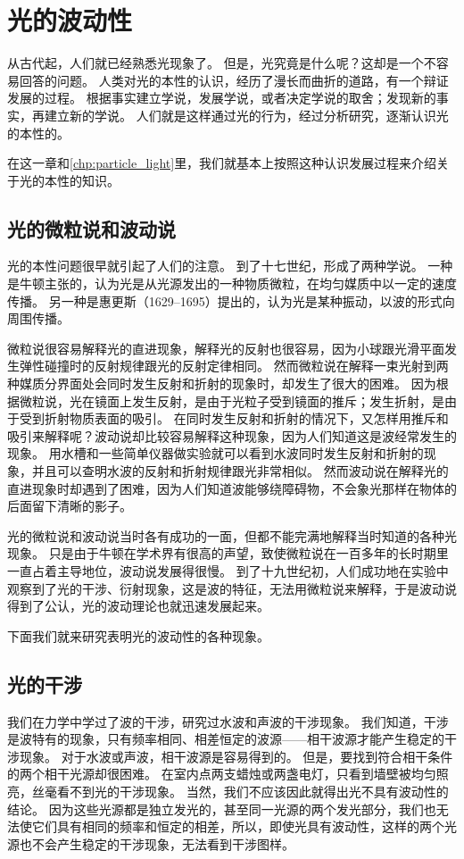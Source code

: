 
\chapter{光的波动性}\label{chp:light_wave_properties}
从古代起，人们就已经熟悉光现象了。
但是，光究竟是什么呢？这却是一个不容易回答的问题。
人类对光的本性的认识，经历了漫长而曲折的道路，有一个辩证发展的过程。
根据事实建立学说，发展学说，或者决定学说的取舍；发现新的事实，再建立新的学说。
人们就是这样通过光的行为，经过分析研究，逐渐认识光的本性的。

在这一章和\cref{chp:particle_light}里，我们就基本上按照这种认识发展过程来介绍关于光的本性的知识。

\section{光的微粒说和波动说}
光的本性问题很早就引起了人们的注意。
到了十七世纪，形成了两种学说。
一种是牛顿主张的，认为光是从光源发出的一种物质微粒，在均匀媒质中以一定的速度传播。
另一种是惠更斯（1629--1695）提出的，认为光是某种振动，以波的形式向周围传播。

微粒说很容易解释光的直进现象，解释光的反射也很容易，因为小球跟光滑平面发生弹性碰撞时的反射规律跟光的反射定律相同。
然而微粒说在解释一束光射到两种媒质分界面处会同时发生反射和折射的现象时，却发生了很大的困难。
因为根据微粒说，光在镜面上发生反射，是由于光粒子受到镜面的推斥；发生折射，是由于受到折射物质表面的吸引。
在同时发生反射和折射的情况下，又怎样用推斥和吸引来解释呢？波动说却比较容易解释这种现象，因为人们知道这是波经常发生的现象。
用水槽和一些简单仪器做实验就可以看到水波同时发生反射和折射的现象，并且可以查明水波的反射和折射规律跟光非常相似。
然而波动说在解释光的直进现象时却遇到了困难，因为人们知道波能够绕障碍物，不会象光那样在物体的后面留下清晰的影子。

光的微粒说和波动说当时各有成功的一面，但都不能完满地解释当时知道的各种光现象。
只是由于牛顿在学术界有很高的声望，致使微粒说在一百多年的长时期里一直占着主导地位，波动说发展得很慢。
到了十九世纪初，人们成功地在实验中观察到了光的干涉、衍射现象，这是波的特征，无法用微粒说来解释，于是波动说得到了公认，光的波动理论也就迅速发展起来。

下面我们就来研究表明光的波动性的各种现象。

\section{光的干涉}
我们在力学中学过了波的干涉，研究过水波和声波的干涉现象。
我们知道，干涉是波特有的现象，只有频率相同、相差恒定的波源——相干波源才能产生稳定的干涉现象。
对于水波或声波，相干波源是容易得到的。
但是，要找到符合相干条件的两个相干光源却很困难。
在室内点两支蜡烛或两盏电灯，只看到墙壁被均匀照亮，丝毫看不到光的干涉现象。
当然，我们不应该因此就得出光不具有波动性的结论。
因为这些光源都是独立发光的，甚至同一光源的两个发光部分，我们也无法使它们具有相同的频率和恒定的相差，所以，即使光具有波动性，这样的两个光源也不会产生稳定的干涉现象，无法看到干涉图样。

